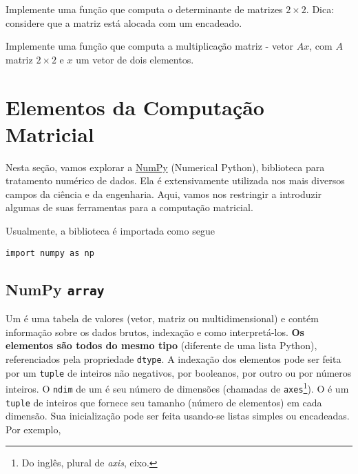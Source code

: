 \documentclass[12pt]{article}
\begin{document}
\begin{exr}
  Implemente uma função que computa o determinante de matrizes $2\times 2$. Dica: considere que a matriz está alocada com um {\PYTHONlist} encadeado.
\end{exr}

\begin{exr}
  Implemente uma função que computa a multiplicação matriz - vetor $Ax$, com $A$ matriz $2\times 2$ e $x$ um vetor de dois elementos.
\end{exr}


\section{Elementos da Computação Matricial}\label{sec_mat}

Nesta seção, vamos explorar a \href{https://numpy.org/}{NumPy} (Numerical Python), biblioteca para tratamento numérico de dados. Ela é extensivamente utilizada nos mais diversos campos da ciência e da engenharia. Aqui, vamos nos restringir a introduzir algumas de suas ferramentas para a computação matricial.

Usualmente, a biblioteca é importada como segue

\begin{lstlisting}
import numpy as np
\end{lstlisting}

\subsection{NumPy \texttt{array}}

Um {\PYTHONnumpyDOTarray} é uma tabela de valores (vetor, matriz ou multidimensional) e contém informação sobre os dados brutos, indexação e como interpretá-los. {\bf Os elementos são todos do mesmo tipo} (diferente de uma lista Python), referenciados pela propriedade \lstinline+dtype+. A indexação dos elementos pode ser feita por um \lstinline+tuple+ de inteiros não negativos, por booleanos, por outro {\PYTHONnumpyDOTarray} ou por números inteiros. O \texttt{ndim} de um {\PYTHONnumpyDOTarray} é seu número de dimensões (chamadas de \lstinline+axes+\footnote{Do inglês, plural de {\it axis}, eixo.}). O {\PYTHONnumpyDOTndarrayDOTshape} é um \lstinline+tuple+ de inteiros que fornece seu tamanho (número de elementos) em cada dimensão. Sua inicialização pode ser feita usando-se listas simples ou encadeadas. Por exemplo,
\end{document}
